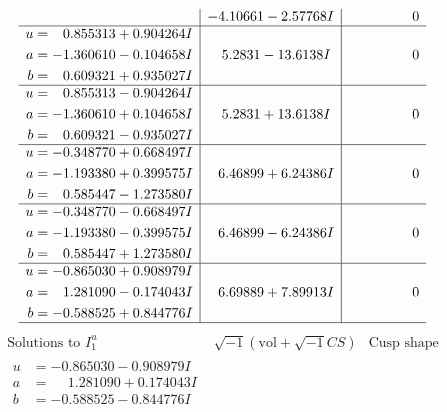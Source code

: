 \documentclass[1p]{elsarticle_modified}
\theoremstyle{definition}
\newcommand{\I}{\sqrt{-1}}
\begin{document}
$$\begin{array}{c|c|c}
 & -4.10661 - 2.57768 I & \phantom{-0.000000 } 0 \\ \hline\begin{aligned}
u &= \phantom{-}0.855313 + 0.904264 I \\
a &= -1.360610 - 0.104658 I \\
b &= \phantom{-}0.609321 + 0.935027 I\end{aligned}
 & \phantom{-}5.2831 - 13.6138 I & \phantom{-0.000000 } 0 \\ \hline\begin{aligned}
u &= \phantom{-}0.855313 - 0.904264 I \\
a &= -1.360610 + 0.104658 I \\
b &= \phantom{-}0.609321 - 0.935027 I\end{aligned}
 & \phantom{-}5.2831 + 13.6138 I & \phantom{-0.000000 } 0 \\ \hline\begin{aligned}
u &= -0.348770 + 0.668497 I \\
a &= -1.193380 + 0.399575 I \\
b &= \phantom{-}0.585447 - 1.273580 I\end{aligned}
 & \phantom{-}6.46899 + 6.24386 I & \phantom{-0.000000 } 0 \\ \hline\begin{aligned}
u &= -0.348770 - 0.668497 I \\
a &= -1.193380 - 0.399575 I \\
b &= \phantom{-}0.585447 + 1.273580 I\end{aligned}
 & \phantom{-}6.46899 - 6.24386 I & \phantom{-0.000000 } 0 \\ \hline\begin{aligned}
u &= -0.865030 + 0.908979 I \\
a &= \phantom{-}1.281090 - 0.174043 I \\
b &= -0.588525 + 0.844776 I\end{aligned}
 & \phantom{-}6.69889 + 7.89913 I & \phantom{-0.000000 } 0\\
 \hline 
 \end{array}$$\newpage$$\begin{array}{c|c|c}  
\text{Solutions to }I^u_{1}& \I (\text{vol} + \sqrt{-1}CS) & \text{Cusp shape}\\
 \hline 
\begin{aligned}
u &= -0.865030 - 0.908979 I \\
a &= \phantom{-}1.281090 + 0.174043 I \\
b &= -0.588525 - 0.844776 I\end{aligned}

\end{array}$$
\end{document}
